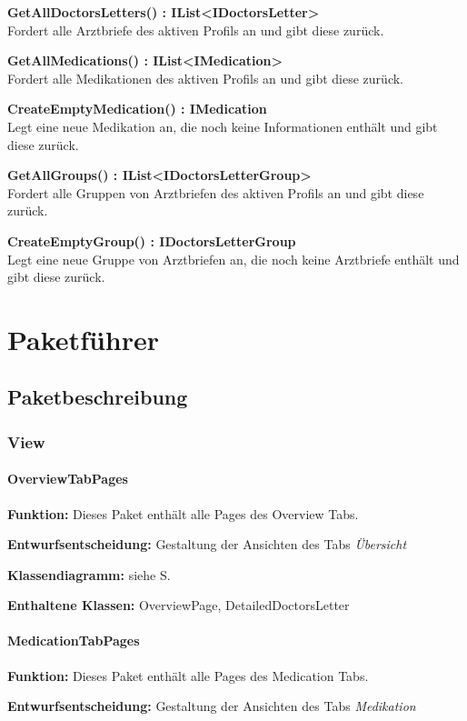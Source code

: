 \documentclass[a4paper]{scrreprt}
\begin{document}
\textbf{GetAllDoctorsLetters() : IList<IDoctorsLetter>}\\
Fordert alle Arztbriefe des aktiven Profils an und gibt diese zurück.

\textbf{GetAllMedications() : IList<IMedication>}\\
Fordert alle Medikationen des aktiven Profils an und gibt diese zurück.

\textbf{CreateEmptyMedication() : IMedication}\\
Legt eine neue Medikation an, die noch keine Informationen enthält und gibt diese zurück.

\textbf{GetAllGroups() : IList<IDoctorsLetterGroup>}\\
Fordert alle Gruppen von Arztbriefen des aktiven Profils an und gibt diese zurück.

\textbf{CreateEmptyGroup() : IDoctorsLetterGroup}\\
Legt eine neue Gruppe von Arztbriefen an, die noch keine Arztbriefe enthält und gibt diese zurück.

\chapter{Paketführer}
\section{Paketbeschreibung}
\subsection{View}

\subsubsection{OverviewTabPages}
\textbf{Funktion:} Dieses Paket enthält alle Pages des Overview Tabs.

\textbf{Entwurfsentscheidung:} Gestaltung der Ansichten des Tabs \textit{Übersicht}

\textbf{Klassendiagramm:} siehe S.

\textbf{Enthaltene Klassen:} OverviewPage, DetailedDoctorsLetter

\subsubsection{MedicationTabPages}
\textbf{Funktion:} Dieses Paket enthält alle Pages des Medication Tabs.

\textbf{Entwurfsentscheidung:} Gestaltung der Ansichten des Tabs \textit{Medikation}
\end{document}
